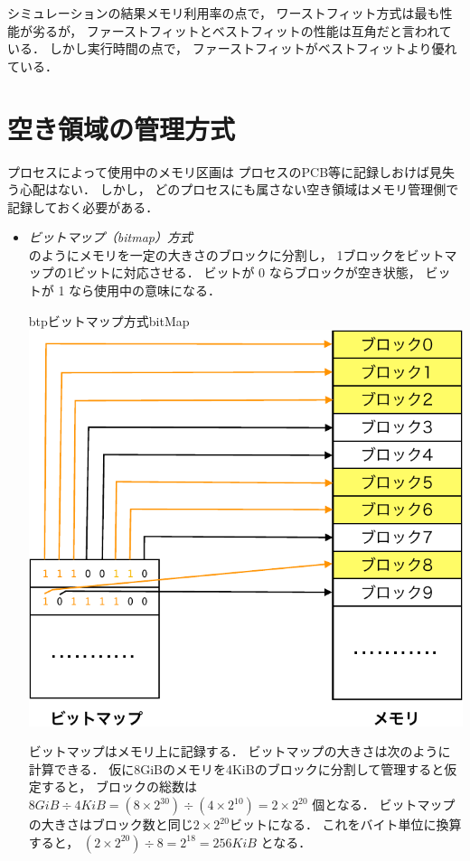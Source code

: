 シミュレーションの結果メモリ利用率の点で，
ワーストフィット方式は最も性能が劣るが，
ファーストフィットとベストフィットの性能は互角だと言われている．
しかし実行時間の点で，
ファーストフィットがベストフィットより優れている\cite{MemoryAllocation}．

\section{空き領域の管理方式}
プロセスによって使用中のメモリ区画は
プロセスのPCB等に記録しおけば見失う心配はない．
しかし，
どのプロセスにも属さない空き領域はメモリ管理側で記録しておく必要がある．

\begin{itemize}
\item \emph{ビットマップ（bitmap）方式}\\
  のようにメモリを一定の大きさのブロックに分割し，
  1ブロックをビットマップの1ビットに対応させる．
  ビットが 0 ならブロックが空き状態，
  ビットが 1 なら使用中の意味になる．

  \begin{myfig}{btp}{ビットマップ方式}{bitMap}
    \includegraphics[scale=0.6]{Fig/bitMap-crop.pdf}
  \end{myfig}

  ビットマップはメモリ上に記録する．
  ビットマップの大きさは次のように計算できる．
  仮に8GiBのメモリを4KiBのブロックに分割して管理すると仮定すると，
  ブロックの総数は
  $8GiB \div 4KiB = (8\times 2^{30}) \div (4 \times 2^{10}) = 2 \times 2^{20}$
  個となる．
  ビットマップの大きさはブロック数と同じ$2 \times 2^{20}$ビットになる．
  これをバイト単位に換算すると，
  $(2 \times 2^{20}) \div 8 = 2^{18} = 256KiB$
  となる．


\end{itemize}
